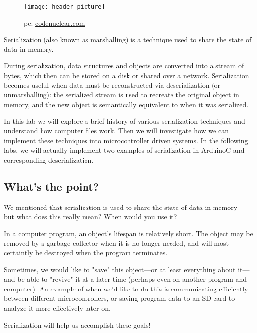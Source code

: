 \begin{wrapfigure}{L}{0.5\textwidth}
    \begin{center}
        \texttt{[image: header-picture]}
    \end{center}
    \caption*{pc: \href{https://www.codenuclear.com/serialization-deserialization-java/}{codenuclear.com}}
\end{wrapfigure}

Serialization (also known as marshalling) is a technique used to share the state of data in memory.  

During serialization, data structures and objects are converted into a stream of bytes, which then can be stored on a disk or shared over a network. Serialization becomes useful when data must be reconstructed via deserialization (or unmarshalling): the serialized stream is used to recreate the original object in memory, and the new object is semantically equivalent to when it was serialized. 

In this lab we will explore a brief history of various serialization techniques and understand how computer files work. Then we will investigate how we can implement these techniques into microcontroller driven systems. In the following labs, we will actually implement two examples of serialization in ArduinoC and corresponding deserialization. 

\subsection{What's the point?}
We mentioned that serialization is used to share the state of data in memory—but what does this really mean? When would you use it?

In a computer program, an object's lifespan is relatively short. The object may be removed by a garbage collector when it is no longer needed, and will most certaintly be destroyed when the program terminates. 

Sometimes, we would like to "save" this object—or at least everything about it—and be able to "revive" it at a later time (perhaps even on another program and computer). An example of when we'd like to do this is communicating efficiently between different microcontrollers, or saving program data to an SD card to analyze it more effectively later on.

Serialization will help us accomplish these goals!
